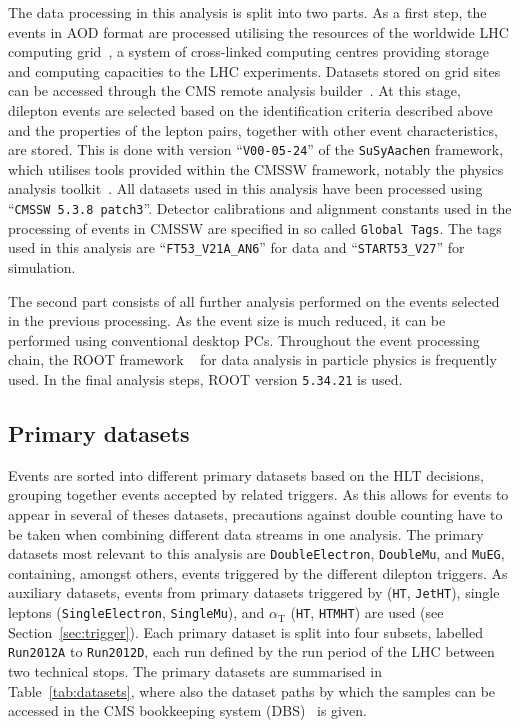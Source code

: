 The data processing in this analysis is split into two parts. As a first step, the events in AOD format are processed utilising the resources of the worldwide LHC computing grid~\cite{doi:10.1146/annurev-nucl-102010-130059,WLCG}, a system of cross-linked computing centres providing storage and computing capacities to the LHC experiments.  Datasets stored on grid sites can be accessed through the CMS remote analysis builder~\cite{CRAB}. At this stage, dilepton events are selected based on the identification criteria described above and the properties of the lepton pairs, together with other event characteristics, are stored. This is done with version ``\verb+V00-05-24+'' of the \verb+SuSyAachen+ framework, which utilises tools provided within the CMSSW framework, notably the physics analysis toolkit~\cite{PATNote}. All datasets used in this analysis have been processed using ``\verb+CMSSW 5.3.8 patch3+''. Detector calibrations and alignment constants used in the processing of events in CMSSW are specified in so called \verb+Global Tags+. The tags used in this analysis are ``\verb+FT53_V21A_AN6+'' for data and ``\verb+START53_V27+'' for simulation.

The second part consists of all further analysis performed on the events selected in the previous processing. As the event size is much reduced, it can be performed using conventional desktop PCs. Throughout the event processing chain, the ROOT framework ~\cite{ROOT} for data analysis in particle physics is frequently used. In the final analysis steps, ROOT version \verb+5.34.21+ is used.  

\subsection{Primary datasets}

Events are sorted into different primary datasets based on the HLT decisions, grouping together events accepted by related triggers. As this allows for events to appear in several of theses datasets, precautions against double counting have to be taken when combining different data streams in one analysis. The primary datasets most relevant to this analysis are \verb+DoubleElectron+, \verb+DoubleMu+, and \verb+MuEG+, containing, amongst others, events triggered by the different dilepton triggers. As auxiliary datasets, events from primary datasets triggered by \HT (\verb+HT+, \verb+JetHT+), single leptons (\verb+SingleElectron+, \verb+SingleMu+), and $\alpha_\mathrm{T}$ (\verb+HT+, \verb+HTMHT+) are used (see Section~\ref{sec:trigger}). Each primary dataset is split into four subsets, labelled \verb+Run2012A+ to \verb+Run2012D+, each run defined by the run period of the LHC between two technical stops. The primary datasets are summarised in Table~\ref{tab:datasets}, where also the dataset paths by which the samples can be accessed in the CMS bookkeeping system (DBS)~\cite{1742-6596-119-7-072001} is given.   


